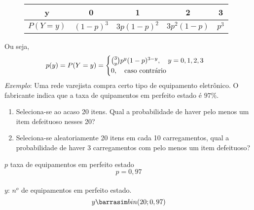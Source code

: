 \documentclass[11pt,a4paper]{book}
\begin{document}
\begin{enumerate}[label=(\alph*)]
\begin{enumerate}
\begin{figure} 
  \centering
  \begin{tabular}{c c c c c}
    \toprule
    y&0&1&2&3\\ \midrule
    $P(Y=y)$&$(1-p)^3$&$3p(1-p)^2$&$3p^2(1-p)$&$p^3$\\ \bottomrule
  \end{tabular}
  \label{fig:7}
\end{figure}
Ou seja,
\begin{align*}
  p(y)=P(Y=y)=\begin{cases}
    \binom{3}{y}p^y (1-p)^{3-y}, \text{\quad}y=0,1,2,3\\
    0, \text{\quad caso contrário}
  \end{cases}
\end{align*}
\emph{Exemplo}: Uma rede varejista compra certo tipo de equipamento eletrônico. O 
fabricante indica que a taxa de quipamentos em perfeito estado é $97\%$.
\begin{enumerate}[label=(\alph*)]
  \item Seleciona-se ao acaso 20 itens. Qual a probabilidade de haver pelo menos 
    um item defeituoso nesses 20?
  \item Seleciona-se aleatoriamente 20 itens em cada 10 carregamentos, qual a 
    probabilidade de haver 3 carregamentos com pelo menos um item defeituoso?
\end{enumerate}
$p$ taxa de equipamentos em perfeito estado\\
$$p=0,97$$\\
$y$: $n^o$ de equipamentos em perfeito estado.\\
$$y \barrasim bin(20;0,97)$$\\


\end{enumerate}
\end{enumerate}
\end{document}

